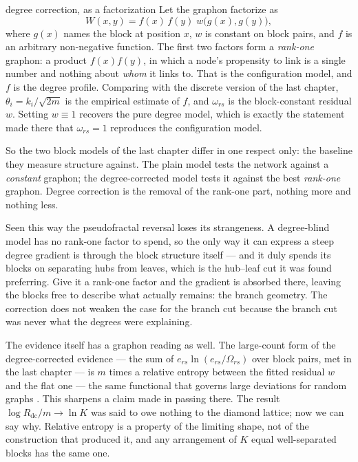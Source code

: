 \begin{calculation}{degree correction, as a factorization}
Let the graphon factorize as
\begin{equation}
  W(x,y) = f(x)\,f(y)\;w\big(g(x),g(y)\big),
  \label{eq:gr-factor}
\end{equation}
where $g(x)$ names the block at position $x$, $w$ is constant on block pairs, and
$f$ is an arbitrary non-negative function. The first two factors form a
\emph{rank-one} graphon: a product $f(x)f(y)$, in which a node's propensity to
link is a single number and nothing about \emph{whom} it links to. That is the
configuration model, and $f$ is the degree profile. Comparing with the discrete
version of the last chapter, $\theta_i=k_i/\sqrt{2m}$ is the empirical estimate of
$f$, and $\omega_{rs}$ is the block-constant residual $w$. Setting $w\equiv1$
recovers the pure degree model, which is exactly the statement made there that
$\omega_{rs}=1$ reproduces the configuration model.
\end{calculation}

So the two block models of the last chapter differ in one respect only: the
baseline they measure structure against. The plain model tests the network
against a \emph{constant} graphon; the degree-corrected model tests it against the
best \emph{rank-one} graphon. Degree correction is the removal of the rank-one
part, nothing more and nothing less.

Seen this way the pseudofractal reversal loses its strangeness. A degree-blind
model has no rank-one factor to spend, so the only way it can express a steep
degree gradient is through the block structure itself --- and it duly spends its
blocks on separating hubs from leaves, which is the hub--leaf cut it was found
preferring. Give it a rank-one factor and the gradient is absorbed there, leaving
the blocks free to describe what actually remains: the branch geometry. The
correction does not weaken the case for the branch cut because the branch cut was
never what the degrees were explaining.

The evidence itself has a graphon reading as well. The large-count form of the
degree-corrected evidence --- the sum of $e_{rs}\ln(e_{rs}/\Omega_{rs})$ over
block pairs, met in the last chapter --- is $m$ times a relative entropy between
the fitted residual $w$ and the flat one --- the same functional that governs large deviations for
random graphs \citep{chatterjee2011}. This sharpens a claim made in passing there.
The result $\log R_{\mathrm{dc}}/m\to\ln K$ was said to owe nothing to the diamond
lattice; now we can say why. Relative entropy is a property of the limiting shape,
not of the construction that produced it, and any arrangement of $K$ equal
well-separated blocks has the same one.

